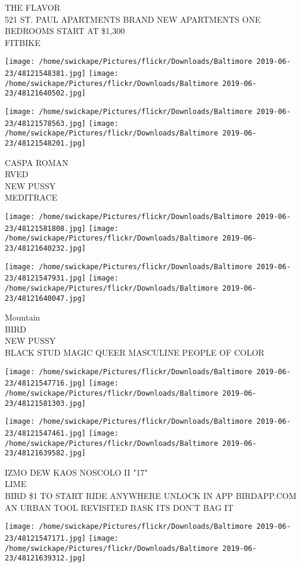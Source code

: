 \documentclass[10pt,letterpaper]{article}
\begin{document}
THE FLAVOR\\
521 ST. PAUL APARTMENTS BRAND NEW APARTMENTS ONE BEDROOMS START AT \$1,300\\
FITBIKE
\pagebreak

\texttt{[image: /home/swickape/Pictures/flickr/Downloads/Baltimore 2019-06-23/48121548381.jpg]}
\texttt{[image: /home/swickape/Pictures/flickr/Downloads/Baltimore 2019-06-23/48121640502.jpg]}

\texttt{[image: /home/swickape/Pictures/flickr/Downloads/Baltimore 2019-06-23/48121578563.jpg]}
\texttt{[image: /home/swickape/Pictures/flickr/Downloads/Baltimore 2019-06-23/48121548201.jpg]}

CASPA ROMAN\\
RVED\\
NEW PUSSY\\
MEDITRACE
\pagebreak

\texttt{[image: /home/swickape/Pictures/flickr/Downloads/Baltimore 2019-06-23/48121581808.jpg]}
\texttt{[image: /home/swickape/Pictures/flickr/Downloads/Baltimore 2019-06-23/48121640232.jpg]}

\texttt{[image: /home/swickape/Pictures/flickr/Downloads/Baltimore 2019-06-23/48121547931.jpg]}
\texttt{[image: /home/swickape/Pictures/flickr/Downloads/Baltimore 2019-06-23/48121640047.jpg]}

Mountain\\
BIRD\\
NEW PUSSY\\
BLACK STUD MAGIC QUEER MASCULINE PEOPLE OF COLOR
\pagebreak

\texttt{[image: /home/swickape/Pictures/flickr/Downloads/Baltimore 2019-06-23/48121547716.jpg]}
\texttt{[image: /home/swickape/Pictures/flickr/Downloads/Baltimore 2019-06-23/48121581303.jpg]}

\texttt{[image: /home/swickape/Pictures/flickr/Downloads/Baltimore 2019-06-23/48121547461.jpg]}
\texttt{[image: /home/swickape/Pictures/flickr/Downloads/Baltimore 2019-06-23/48121639582.jpg]}

IZMO DEW KAOS NOSCOLO II "17"\\
LIME\\
BIRD \$1 TO START RIDE ANYWHERE UNLOCK IN APP BIRDAPP.COM\\
AN URBAN TOOL REVISITED BASK ITS DON'T BAG IT
\pagebreak

\texttt{[image: /home/swickape/Pictures/flickr/Downloads/Baltimore 2019-06-23/48121547171.jpg]}
\texttt{[image: /home/swickape/Pictures/flickr/Downloads/Baltimore 2019-06-23/48121639312.jpg]}
\end{document}
